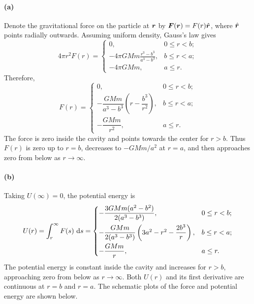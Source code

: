 \documentclass{article}
\begin{document}
\begin{solution}
	\paragraph{(a)} Denote the gravitational force on the particle at $\boldsymbol{r}$ by $\boldsymbol{F}(\boldsymbol{r}) = F(r) \hat{\boldsymbol{r}}$, where $\hat{\boldsymbol{r}}$ points radially outwards. Assuming uniform density, Gauss's law gives
	\[ 4\pi r^2 F(r) = \begin{cases}
		0, & 0 \le r < b; \\
		-4 \pi GMm \frac{r^3 - b^3}{a^3 - b^3}, & b \le r < a; \\
		-4 \pi GMm, & a \le r.
	\end{cases} \]
	Therefore,
	\[ F(r) = \begin{cases}
		0, & 0 \le r < b; \\[5pt]
		-\dfrac{GMm}{a^3 - b^3}\left(r - \dfrac{b^3}{r^2}\right), & b \le r < a; \\[9pt]
		-\dfrac{GMm}{r^2}, & a \le r.
	\end{cases} \]
	The force is zero inside the cavity and points towards the center for $r>b$. Thus $F(r)$ is zero up to $r=b$, decreases to $-GMm/a^2$ at $r=a$, and then approaches zero from below as $r \to \infty$.

	\Needspace{10cm}
	\paragraph{(b)} Taking $U(\infty)=0$, the potential energy is
	\[ U(r) = \int_r^\infty F(s)\,\,\mathrm{d} s = \begin{cases}
		-\dfrac{3GMm(a^2-b^2)}{2(a^3-b^3)}, & 0 \le r < b; \\[9pt]
		-\dfrac{GMm}{2(a^3-b^3)}\left(3a^2-r^2-\dfrac{2b^3}{r}\right), & b \le r < a; \\[9pt]
		-\dfrac{GMm}{r}, & a \le r.
	\end{cases} \]
	The potential energy is constant inside the cavity and increases for $r>b$, approaching zero from below as $r \to \infty$. Both $U(r)$ and its first derivative are continuous at $r=b$ and $r=a$. The schematic plots of the force and potential energy are shown below.
	\begin{center}
		\resizebox{.46\linewidth}{!}{}\hfill
		\resizebox{.46\linewidth}{!}{}
	\end{center}
\end{solution}
\end{document}
